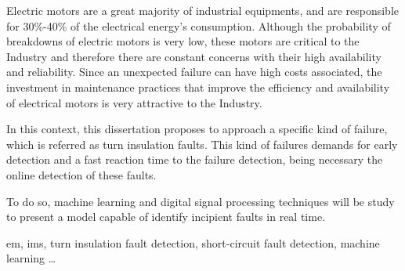 Electric motors are a great majority of industrial equipments, and are responsible for 30\%-40\% of the electrical energy's consumption. 
Although the probability of breakdowns of electric motors is very low, these motors are critical to the Industry and therefore there are constant concerns with their high availability and reliability.
Since an unexpected failure can have high costs associated, the investment in maintenance practices that improve the efficiency and availability of electrical motors is very attractive to the Industry.

In this context, this dissertation proposes to approach a specific kind of failure, which is referred as turn insulation faults. 
This kind of failures demands for early detection and a fast reaction time to the failure detection, being necessary the online detection of these faults.

To do so, machine learning and digital signal processing techniques will be study to present a model capable of identify incipient faults in real time.

\begin{keywords}
\acrfull{em}, \acrfull{ims}, turn insulation fault detection, short-circuit fault detection, machine learning \ldots
\end{keywords} 
